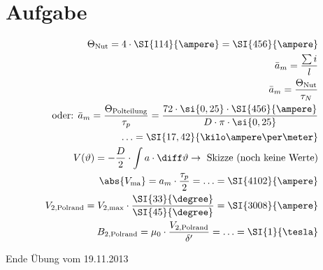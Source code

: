 \documentclass[10pt,a4paper]{article}
\begin{document}
\section{Aufgabe}
\begin{align*}
\Theta_\text{Nut} = 4 \cdot \SI{114}{\ampere} = \SI{456}{\ampere}\\
\bar{a}_m = \frac{\sum i}{l}\\
\bar{a}_m = \frac{\Theta_\text{Nut}}{\tau_N}\\
\text{oder: } \bar{a}_m = \frac{\Theta_\text{Polteilung}}{\tau_p} = \frac{72 \cdot \si{0,25} \cdot \SI{456}{\ampere}}{D \cdot \pi \cdot \si{0,25}}\\
\ldots = \SI{17,42}{\kilo\ampere\per\meter}\\
V(\vartheta) = - \frac{D}{2} \cdot \int a \cdot \diff \vartheta \rightarrow \text{ Skizze (noch keine Werte)}\\
\abs{V_\text{ma}} = a_m \cdot \frac{\tau_p}{2} = \ldots = \SI{4102}{\ampere}\\
V_\text{2,Polrand} = V_\text{2,max} \cdot \frac{\SI{33}{\degree}}{\SI{45}{\degree}} = \SI{3008}{\ampere}\\
B_\text{2,Polrand} = \mu_0 \cdot \frac{V_\text{2,Polrand}}{\delta'} = \ldots = \SI{1}{\tesla}
\end{align*}

Ende Übung vom 19.11.2013
\end{document}
